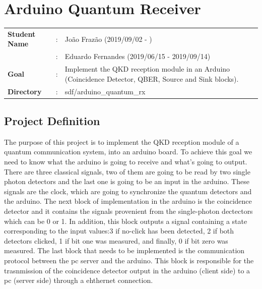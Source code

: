 \clearpage
\section{Arduino Quantum Receiver}

\begin{refsection}
	
	\begin{tcolorbox}	
		\begin{tabular}{p{2.75cm} p{0.2cm} p{10.5cm}} 	
			\textbf{Student Name}  		&:&  Jo\~ao Fraz\~ao (2019/09/02 - )\\
			&:&  Eduardo Fernandes (2019/06/15 - 2019/09/14)\\
			\textbf{Goal}          &:& Implement the QKD reception module in an Arduino (Coincidence Detector, QBER, Source and Sink blocks).\\
			\textbf{Directory}              &:& sdf/arduino\_quantum\_rx
		\end{tabular}
	\end{tcolorbox}
	
	
	\subsection{Project Definition}
	
		The purpose of this project is to implement the QKD reception module of a quantum communication system, into an arduino board. To achieve this goal we need to know what the arduino is going to receive and what's going to output.
		There are three classical signals, two of them are going to be read by two single photon detectors and the last one is going to be an input in the arduino. These signals are the clock, which are going to synchronize the quantum detectors and the arduino. The next block of implementation in the arduino is the coincidence detector and it contains the signals provenient from the single-photon dectectors which can be 0 or 1. In addition, this block outputs a signal containing a state corresponding to the input values:3 if no-click has been detected, 2 if both detectors clicked, 1 if bit one was measured, and finally, 0 if bit zero was measured. The last block that needs to be implemented is the communication protocol between the pc server and the arduino. This block is responsible for the trasnmission of the coincidence detector output in the arduino (client side) to a pc (server side) through a ehthernet connection.
	

\end{refsection}
